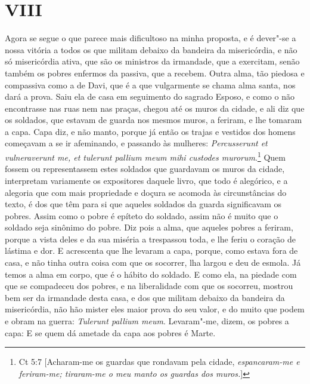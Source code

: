 \section*{VIII}

Agora se segue o que parece mais dificultoso na minha proposta, e é
dever"-se a nossa vitória a todos os que militam debaixo da bandeira da
misericórdia, e não só misericórdia ativa, que são os ministros da
irmandade, que a exercitam, senão também os pobres enfermos da passiva,
que a recebem. Outra alma, tão piedosa e compassiva como a de Davi, que
é a que vulgarmente se chama alma santa, nos dará a prova. Saiu ela de
casa em seguimento do sagrado Esposo, e como o não encontrasse nas ruas
nem nas praças, chegou até os muros da cidade, e ali diz que os
soldados, que estavam de guarda nos mesmos muros, a feriram, e lhe
tomaram a capa. Capa diz, e não manto, porque já então os trajas e
vestidos dos homens começavam a se ir afeminando, e passando às
mulheres: \emph{Percusserunt et vulneraverunt me, et tulerunt pallium
meum mihi custodes murorum}.\footnote{Ct 5:7 [Acharam-me os guardas que rondavam pela cidade, \textit{espancaram-me e feriram-me; tiraram-me o meu manto os guardas dos muros.}]} Quem fossem ou representassem
estes soldados que guardavam os muros da cidade, interpretam variamente
os expositores daquele livro, que todo é alegórico, e a alegoria que com
mais propriedade e doçura se acomoda às circunstâncias do texto, é dos
que têm para si que aqueles soldados da guarda significavam os pobres.
Assim como o pobre é epíteto do soldado, assim não é muito que o soldado
seja sinônimo do pobre. Diz pois a alma, que aqueles pobres a feriram,
porque a vista deles e da sua miséria a trespassou toda, e lhe feriu o
coração de lástima e dor. E acrescenta que lhe levaram a capa, porque,
como estava fora de casa, e não tinha outra coisa com que os socorrer,
lha largou e deu de esmola. Já temos a alma em corpo, que é o hábito do
soldado. E como ela, na piedade com que se compadeceu dos pobres, e na
liberalidade com que os socorreu, mostrou bem ser da irmandade desta
casa, e dos que militam debaixo da bandeira da misericórdia, não hão
mister eles maior prova do seu valor, e do muito que podem e obram na
guerra: \emph{Tulerunt pallium meum}. Levaram"-me, dizem, os pobres a
capa: E se quem dá ametade da capa aos pobres é Marte.

